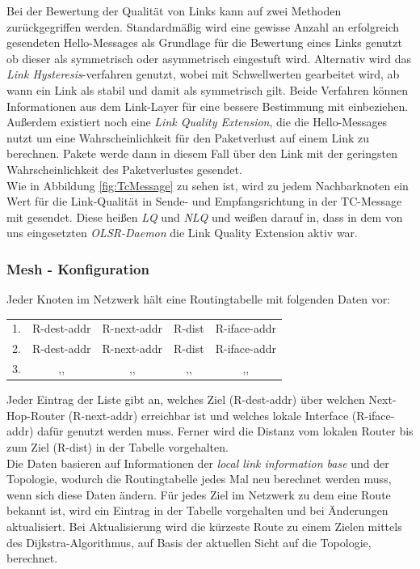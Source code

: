 \documentclass[10pt]{scrartcl}
\begin{document}
Bei der Bewertung der Qualität von Links kann auf zwei Methoden zurückgegriffen werden.
Standardmäßig wird eine gewisse Anzahl an erfolgreich gesendeten Hello-Messages als Grundlage für die Bewertung eines Links genutzt ob dieser als symmetrisch oder asymmetrisch eingestuft wird.
Alternativ wird das \textit{Link Hysteresis}-verfahren genutzt, wobei mit Schwellwerten gearbeitet wird, ab wann ein Link als stabil und damit als symmetrisch gilt.
Beide Verfahren können Informationen aus dem Link-Layer für eine bessere Bestimmung mit einbeziehen.
Außerdem existiert noch eine \textit{Link Quality Extension}, die die Hello-Messages nutzt um eine Wahrscheinlichkeit für den Paketverlust auf einem Link zu berechnen.
Pakete werde dann in diesem Fall über den Link mit der geringsten Wahrscheinlichkeit des Paketverlustes gesendet.\\
Wie in Abbildung \ref{fig:TcMessage} zu sehen ist, wird zu jedem Nachbarknoten ein Wert für die Link-Qualität in Sende- und Empfangsrichtung in der TC-Message mit gesendet.
Diese heißen \textit{LQ} und \textit{NLQ} und weißen darauf in, dass in dem von uns eingesetzten \textit{OLSR-Daemon} die Link Quality Extension aktiv war.

\subsubsection{Mesh - Konfiguration}
Jeder Knoten im Netzwerk hält eine Routingtabelle mit folgenden Daten vor:

\begin{tabular}{l c c c c}
1. & R-dest-addr & R-next-addr & R-dist & R-iface-addr \\
2. &  R-dest-addr & R-next-addr & R-dist & R-iface-addr \\
3. & ,, & ,, & ,, & ,, \\
\end{tabular}

Jeder Eintrag der Liste gibt an, welches Ziel (R-dest-addr) über welchen Next-Hop-Router (R-next-addr) erreichbar ist und welches lokale Interface (R-iface-addr) dafür genutzt werden muss. Ferner wird die Distanz vom lokalen Router bis zum Ziel (R-dist) in der Tabelle vorgehalten.\\
Die Daten basieren auf Informationen der \textit{local link information base} und der Topologie, wodurch die Routingtabelle jedes Mal neu berechnet werden muss, wenn sich diese Daten ändern. Für jedes Ziel im Netzwerk zu dem eine Route bekannt ist, wird ein Eintrag in der Tabelle vorgehalten und bei Änderungen aktualisiert. Bei Aktualisierung wird die kürzeste Route zu einem Zielen mittels des Dijkstra-Algorithmus, auf Basis der aktuellen Sicht auf die Topologie, berechnet.
\end{document}
